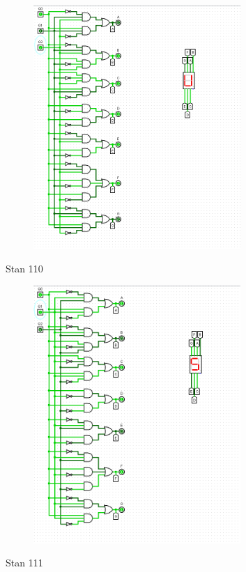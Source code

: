 \documentclass[]{article}
\begin{document}
\begin{figure}[H]
	\centering
	\includegraphics[width=0.7\textwidth]{DWA_101.png}
\end{figure}
\newpage
Stan 110
\begin{figure}[H]
	\centering
	\includegraphics[width=0.7\textwidth]{DWA_110.png}
\end{figure}
\newpage
Stan 111
\end{document}
